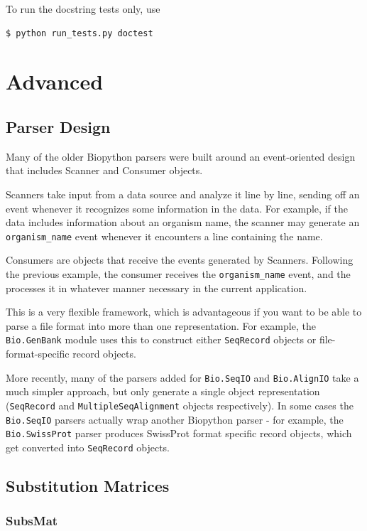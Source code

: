\documentclass{report}
\begin{document}
To run the docstring tests only, use
\begin{verbatim}
$ python run_tests.py doctest
\end{verbatim}

\chapter{Advanced}
\label{chapter:advanced}

\section{Parser Design}

Many of the older Biopython parsers were built around an event-oriented
design that includes Scanner and Consumer objects.

Scanners take input from a data source and analyze it line by line,
sending off an event whenever it recognizes some information in the
data.  For example, if the data includes information about an organism
name, the scanner may generate an \verb|organism_name| event whenever it
encounters a line containing the name.

Consumers are objects that receive the events generated by Scanners.
Following the previous example, the consumer receives the
\verb|organism_name| event, and the processes it in whatever manner
necessary in the current application.

This is a very flexible framework, which is advantageous if you want to
be able to parse a file format into more than one representation.  For
example, the \verb|Bio.GenBank| module uses this to construct either
\verb|SeqRecord| objects or file-format-specific record objects.

More recently, many of the parsers added for \verb|Bio.SeqIO| and
\verb|Bio.AlignIO| take a much simpler approach, but only generate a
single object representation (\verb|SeqRecord| and
\verb|MultipleSeqAlignment| objects respectively). In some cases the
\verb|Bio.SeqIO| parsers actually wrap
another Biopython parser - for example, the \verb|Bio.SwissProt| parser
produces SwissProt format specific record objects, which get converted
into \verb|SeqRecord| objects.

\section{Substitution Matrices}

\subsection{SubsMat}
\end{document}

